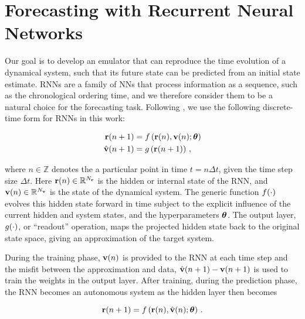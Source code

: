 \section{Forecasting with Recurrent Neural Networks}
\label{sec:rnn-architecture}

Our goal is to develop an emulator that can reproduce the time evolution of a
dynamical system, such that its future state can be predicted from an initial
state estimate.
RNNs are a family of NNs that process information as a sequence,
such as the chronological ordering time,
and we therefore consider them to be a natural choice for the forecasting
task.
Following \citet{goodfellow_sequence_2016}, we use the following discrete-time form
for RNNs in this work:
\begin{linenomath*}\begin{equation}
    \begin{aligned}
        \mathbf{r}(n+1) &= f\left(
            \mathbf{r}(n), \mathbf{v}(n); \bm{\theta}
            \right) \\
        \hat{\mathbf{v}}(n+1) &= g \left( \mathbf{r}(n+1) \right) \, ,
    \end{aligned}
    \label{eq:rnn}
\end{equation}\end{linenomath*}
where $n\in\mathbb{Z}$ denotes the a particular point in time $t = n\Delta t$,
given the time step size $\Delta t$.
Here
$\mathbf{r}(n)\in\mathbb{R}^{N_{\mathbf{r}}}$ is the hidden or internal state of the RNN,
and
$\mathbf{v}(n)\in\mathbb{R}^{N_{\mathbf{v}}}$ is the state of the dynamical system.
The generic function $f(\cdot)$ evolves this hidden state forward in
time subject to the explicit
influence of the current hidden and system states, and the hyperparameters
$\bm{\theta}$.
The output layer,
$g(\cdot)$, or ``readout'' operation,
maps the projected hidden state back to the original state space, giving an
approximation of the target system.

During the training phase, $\mathbf{v}(n)$ is provided to the RNN at each time step
and the misfit between the approximation and data,
$\hat{\mathbf{v}}(n+1) - \mathbf{v}(n+1)$ is used to train the weights in the output
layer.
After training, during the prediction phase, the RNN becomes an autonomous
system as the hidden layer then becomes
\begin{linenomath*}\begin{equation*}
    \mathbf{r}(n+1) = f\left(
        \mathbf{r}(n), \hat{\mathbf{v}}(n); \bm{\theta}\right) \, .
\end{equation*}\end{linenomath*}

